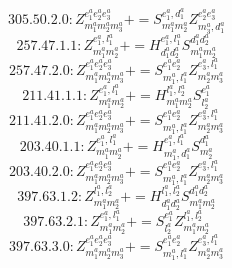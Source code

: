 \documentclass[letterpaper,10pt,fleqn,leqno,onecolumn]{article}
\begin{document}
\begin{equation} \;\;\;\;\;\;  305.50.2.0: Z^{e_{1}^{a}e_{2}^{a}e_{3}^{a}}_{m_{1}^{a}m_{2}^{a}m_{3}^{a}}+=S^{e_{1}^{a},d_{1}^{a}}_{m_{1}^{a}m_{2}^{a}}Z^{e_{2}^{a}e_{3}^{a}}_{m_{3}^{a},d_{1}^{a}} \end{equation}
\begin{equation} \;\;\;\;\;\;  257.47.1.1: Z^{e_{1}^{a},l_{1}^{a}}_{m_{1}^{a}m_{2}^{a}}+=H^{e_{1}^{a},l_{1}^{a}}_{d_{1}^{a}d_{2}^{a}}S^{d_{1}^{a}d_{2}^{a}}_{m_{1}^{a}m_{2}^{a}} \end{equation}
\begin{equation} \;\;\;\;\;\;  257.47.2.0: Z^{e_{1}^{a}e_{2}^{a}e_{3}^{a}}_{m_{1}^{a}m_{2}^{a}m_{3}^{a}}+=S^{e_{1}^{a}e_{2}^{a}}_{m_{1}^{a},l_{1}^{a}}Z^{e_{3}^{a},l_{1}^{a}}_{m_{2}^{a}m_{3}^{a}} \end{equation}
\begin{equation} \;\;\;\;\;\;  211.41.1.1: Z^{e_{1}^{a},l_{1}^{a}}_{m_{1}^{a}m_{2}^{a}}+=H^{l_{1}^{a},l_{2}^{a}}_{m_{1}^{a}m_{2}^{a}}S^{e_{1}^{a}}_{l_{2}^{a}} \end{equation}
\begin{equation} \;\;\;\;\;\;  211.41.2.0: Z^{e_{1}^{a}e_{2}^{a}e_{3}^{a}}_{m_{1}^{a}m_{2}^{a}m_{3}^{a}}+=S^{e_{1}^{a}e_{2}^{a}}_{m_{1}^{a},l_{1}^{a}}Z^{e_{3}^{a},l_{1}^{a}}_{m_{2}^{a}m_{3}^{a}} \end{equation}
\begin{equation} \;\;\;\;\;\;  203.40.1.1: Z^{e_{1}^{a},l_{1}^{a}}_{m_{1}^{a}m_{2}^{a}}+=H^{e_{1}^{a},l_{1}^{a}}_{m_{1}^{a},d_{1}^{a}}S^{d_{1}^{a}}_{m_{2}^{a}} \end{equation}
\begin{equation} \;\;\;\;\;\;  203.40.2.0: Z^{e_{1}^{a}e_{2}^{a}e_{3}^{a}}_{m_{1}^{a}m_{2}^{a}m_{3}^{a}}+=S^{e_{1}^{a}e_{2}^{a}}_{m_{1}^{a},l_{1}^{a}}Z^{e_{3}^{a},l_{1}^{a}}_{m_{2}^{a}m_{3}^{a}} \end{equation}
\begin{equation} \;\;\;\;\;\;  397.63.1.2: Z^{l_{1}^{a},l_{2}^{a}}_{m_{1}^{a}m_{2}^{a}}+=H^{l_{1}^{a},l_{2}^{a}}_{d_{1}^{a}d_{2}^{a}}S^{d_{1}^{a}d_{2}^{a}}_{m_{1}^{a}m_{2}^{a}} \end{equation}
\begin{equation} \;\;\;\;\;\;  397.63.2.1: Z^{e_{1}^{a},l_{1}^{a}}_{m_{1}^{a}m_{2}^{a}}+=S^{e_{1}^{a}}_{l_{2}^{a}}Z^{l_{1}^{a},l_{2}^{a}}_{m_{1}^{a}m_{2}^{a}} \end{equation}
\begin{equation} \;\;\;\;\;\;  397.63.3.0: Z^{e_{1}^{a}e_{2}^{a}e_{3}^{a}}_{m_{1}^{a}m_{2}^{a}m_{3}^{a}}+=S^{e_{1}^{a}e_{2}^{a}}_{m_{1}^{a},l_{1}^{a}}Z^{e_{3}^{a},l_{1}^{a}}_{m_{2}^{a}m_{3}^{a}} \end{equation}
\end{document}
